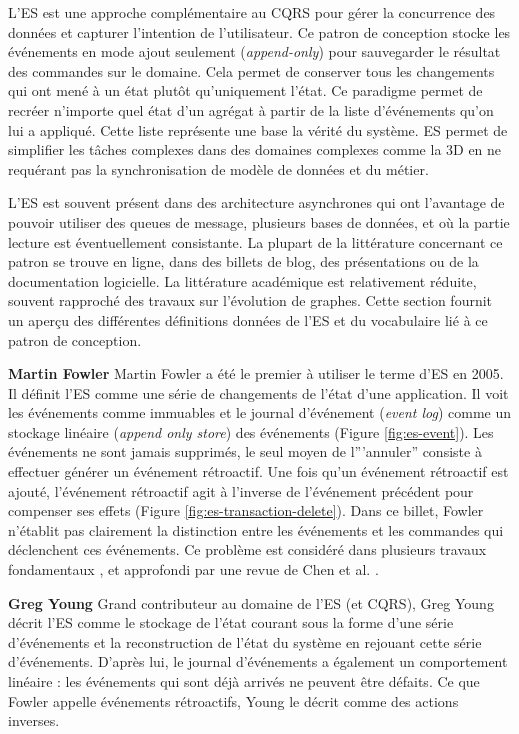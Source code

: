 L'\gls{ES} est une approche complémentaire au \gls{CQRS} pour 
gérer la 
concurrence des données et capturer l'intention de l'utilisateur. Ce patron de 
conception stocke les événements en mode ajout seulement 
(\textit{append-only}) pour sauvegarder le résultat des commandes sur le 
domaine. Cela permet de conserver tous les changements qui ont mené à un 
état plutôt qu'uniquement l'état. Ce paradigme permet de recréer n'importe quel 
état d'un agrégat à partir de la liste d'événements qu'on lui a appliqué. Cette 
liste représente une base la vérité du système. 
\gls{ES} permet de simplifier les tâches complexes dans des 
domaines complexes comme la 3D en ne requérant pas la synchronisation de 
modèle de données et du métier. 

L'\gls{ES} est souvent présent dans des architecture asynchrones qui ont 
l'avantage de pouvoir utiliser des queues de message, plusieurs bases de 
données, et où la partie lecture est éventuellement consistante.
La plupart de la littérature concernant ce patron se trouve en ligne, dans des 
billets de blog, des présentations ou de la documentation logicielle. La 
littérature académique est relativement réduite, souvent rapproché des travaux 
sur l'évolution de graphes. Cette section fournit un aperçu des différentes 
définitions données de l'\gls{ES} et du vocabulaire lié à ce patron de conception.

\textbf{Martin Fowler} Martin Fowler a été le premier à utiliser le terme 
d'\acrlong{ES} en 2005. Il définit l'\gls{ES} comme \og une série de 
changements 
de l'état d'une application\fg{}. Il voit les événements 
comme immuables et le journal d'événement (\textit{event log}) comme un 
stockage linéaire (\textit{append only store}) des événements (Figure 
\ref{fig:es-event}). 
Les événements ne sont jamais supprimés, le seul moyen de l'''annuler'' consiste à 
effectuer générer un événement rétroactif. 
Une fois qu'un événement rétroactif est ajouté, l'événement rétroactif agit à 
l'inverse de l'événement précédent pour compenser ses effets (Figure 
\ref{fig:es-transaction-delete}). 
Dans ce billet, Fowler n'établit pas clairement la distinction entre les 
événements 
et les commandes qui déclenchent ces événements. Ce problème est 
considéré dans plusieurs travaux fondamentaux \cite{Prakash1994,Sun2002,Weiss2009a,Weiss2010}, et approfondi par une revue de Chen et al. \cite{Cheng2013}.

\textbf{Greg Young} Grand contributeur au domaine de l'\gls{ES} (et \gls{CQRS}), Greg 
Young décrit l'\gls{ES} comme \og le stockage de l'état courant sous la forme 
d'une série d'événements et la reconstruction de l'état du système en rejouant 
cette série d'événements\fg{}. D'après lui, le journal d'événements a également 
un comportement linéaire : les événements qui sont déjà arrivés ne peuvent 
être défaits. Ce que Fowler appelle événements rétroactifs, Young le décrit 
comme des actions inverses.

